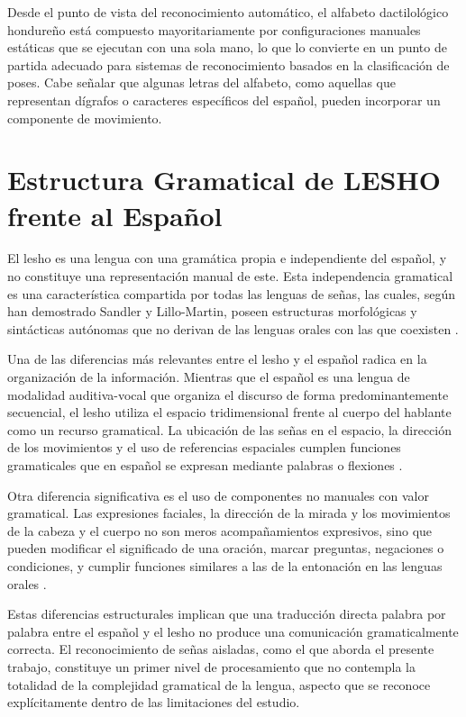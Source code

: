 Desde el punto de vista del reconocimiento automático, el alfabeto dactilológico hondureño
está compuesto mayoritariamente por configuraciones manuales estáticas que se ejecutan
con una sola mano, lo que lo convierte en un punto de partida adecuado para sistemas de
reconocimiento basados en la clasificación de poses. Cabe señalar que algunas letras del
alfabeto, como aquellas que representan dígrafos o caracteres específicos del español,
pueden incorporar un componente de movimiento.

\section{Estructura Gramatical de LESHO frente al Español}

El \acrshort{lesho} es una lengua con una gramática propia e independiente del español, y no
constituye una representación manual de este. Esta independencia gramatical es una
característica compartida por todas las lenguas de señas, las cuales, según han demostrado
Sandler y Lillo-Martin, poseen estructuras morfológicas y sintácticas autónomas que no
derivan de las lenguas orales con las que coexisten \cite{sandler_universals_2006}.

Una de las diferencias más relevantes entre el \acrshort{lesho} y el español radica en la organización
de la información. Mientras que el español es una lengua de modalidad auditiva-vocal que
organiza el discurso de forma predominantemente secuencial, el \acrshort{lesho} utiliza el espacio
tridimensional frente al cuerpo del hablante como un recurso gramatical. La ubicación de
las señas en el espacio, la dirección de los movimientos y el uso de referencias espaciales
cumplen funciones gramaticales que en español se expresan mediante palabras o
flexiones \cite{sandler_universals_2006}.

Otra diferencia significativa es el uso de componentes no manuales con valor gramatical.
Las expresiones faciales, la dirección de la mirada y los movimientos de la cabeza y el
cuerpo no son meros acompañamientos expresivos, sino que pueden modificar el significado
de una oración, marcar preguntas, negaciones o condiciones, y cumplir funciones similares
a las de la entonación en las lenguas orales \cite{sandler_universals_2006}.

Estas diferencias estructurales implican que una traducción directa palabra por palabra
entre el español y el \acrshort{lesho} no produce una comunicación gramaticalmente correcta. El
reconocimiento de señas aisladas, como el que aborda el presente trabajo, constituye un
primer nivel de procesamiento que no contempla la totalidad de la complejidad gramatical
de la lengua, aspecto que se reconoce explícitamente dentro de las limitaciones del estudio.
